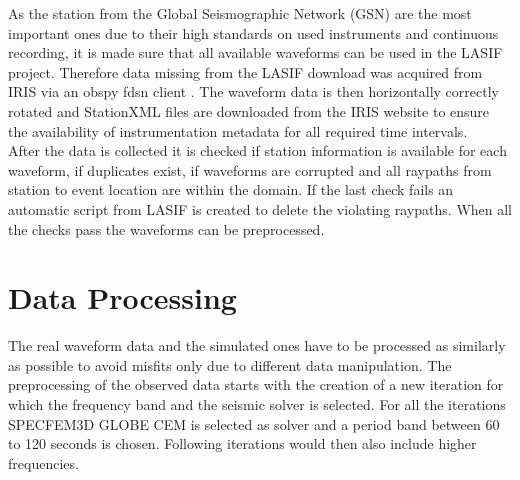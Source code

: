 As the station from the Global Seismographic Network (GSN) are the most important ones due to their high standards on used 
instruments and continuous recording, it is made sure that all available waveforms can be used in the LASIF project. 
Therefore data missing from the LASIF download was acquired from IRIS via an obspy fdsn client \citep{Krischer2015}. 
The waveform data is then horizontally correctly rotated and StationXML files are downloaded from the IRIS website to
ensure the availability of instrumentation metadata for all required time intervals. \\

After the data is collected it is checked if station information is available for each waveform, if duplicates exist, if 
waveforms are corrupted and all raypaths from station to event location are within the domain. 
If the last check fails an automatic script from LASIF is created to delete the violating raypaths. 
When all the checks pass the waveforms can be preprocessed. 



\section{Data Processing}

The real waveform data and the simulated ones have to be processed as similarly as possible to avoid misfits only due
to different data manipulation. 
The preprocessing of the observed data starts with the creation of a new iteration for which the frequency band and 
the seismic solver is selected.
For all the iterations SPECFEM3D GLOBE CEM is selected as solver and a period band between 60 to 120 seconds is chosen.
Following iterations would then also include higher frequencies.


